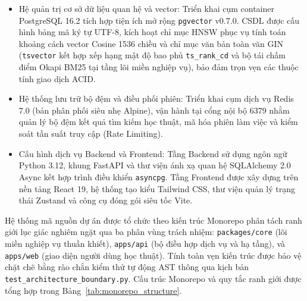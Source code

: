 {\sloppy
\begin{itemize}
    \item Hệ quản trị cơ sở dữ liệu quan hệ và vector: Triển khai cụm container PostgreSQL 16.2 tích hợp tiện ích mở rộng \texttt{pgvector} v0.7.0. CSDL được cấu hình bảng mã ký tự UTF-8, kích hoạt chỉ mục HNSW phục vụ tính toán khoảng cách vector Cosine 1536 chiều và chỉ mục văn bản toàn văn GIN (\texttt{tsvector} kết hợp xếp hạng mật độ bao phủ \texttt{ts\_}\allowbreak\texttt{rank\_}\allowbreak\texttt{cd} và bộ tái chấm điểm Okapi BM25 tại tầng lõi miền nghiệp vụ), bảo đảm trọn vẹn các thuộc tính giao dịch ACID.
    \item Hệ thống lưu trữ bộ đệm và điều phối phiên: Triển khai cụm dịch vụ Redis 7.0 (bản phân phối siêu nhẹ Alpine), vận hành tại cổng nội bộ 6379 nhằm quản lý bộ đệm kết quả tìm kiếm học thuật, mã hóa phiên làm việc và kiểm soát tần suất truy cập (Rate Limiting).
    \item Cấu hình dịch vụ Backend và Frontend: Tầng Backend sử dụng ngôn ngữ Python 3.12, khung FastAPI và thư viện ánh xạ quan hệ SQLAlchemy 2.0 Async kết hợp trình điều khiển \texttt{asyncpg}. Tầng Frontend được xây dựng trên nền tảng React 19, hệ thống tạo kiểu Tailwind CSS, thư viện quản lý trạng thái Zustand và công cụ đóng gói siêu tốc Vite.
\end{itemize}
\par}

Hệ thống mã nguồn dự án được tổ chức theo kiến trúc Monorepo phân tách ranh giới lục giác nghiêm ngặt qua ba phân vùng trách nhiệm: \texttt{packages/core} (lõi miền nghiệp vụ thuần khiết), \texttt{apps/api} (bộ điều hợp dịch vụ và hạ tầng), và \texttt{apps/web} (giao diện người dùng học thuật). Tính toàn vẹn kiến trúc được bảo vệ chặt chẽ bằng rào chắn kiểm thử tự động AST thông qua kịch bản \texttt{test\_architecture\_boundary.py}. Cấu trúc Monorepo và quy tắc ranh giới được tổng hợp trong Bảng~\ref{tab:monorepo_structure}.


